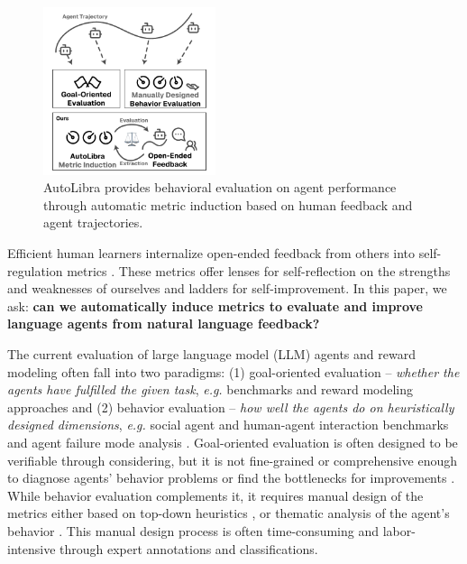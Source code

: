 \begin{figure}
   \vspace{-40pt}
   \centering
   \includegraphics[width=0.45\textwidth]{figs/autolibra.pdf}
   \caption{AutoLibra provides behavioral evaluation on agent performance
    through automatic metric induction based on human feedback and agent trajectories.}
\end{figure}


Efficient human learners internalize open-ended feedback from others into self-regulation metrics
\citep{pintrich2002development,nicol2006formative}.
These metrics offer lenses for self-reflection on the
strengths and weaknesses of ourselves and ladders for self-improvement.
In this paper, we ask:
\textbf{can we automatically induce metrics to evaluate and improve language agents from natural language feedback?} 

   
The current evaluation of large language model (LLM) agents and reward modeling often fall
into two paradigms: (1) goal-oriented evaluation --
\emph{whether the agents have fulfilled the given task},
\emph{e.g.} benchmarks \citep{zhouwebarena,jimenezswe,chan2024mle,paglieri2024balrog} and reward
modeling approaches \citep{pan2024autonomous,chen2025scaling,choudhury2025process}
and (2) behavior evaluation -- \emph{how well the agents do on heuristically designed dimensions},
\emph{e.g.} social agent and human-agent interaction benchmarks \citep{zhousotopia,shao2024collaborative}
and agent failure mode analysis \citep{pan2025why,zhang2023effects,yang2023behavioral}. 
Goal-oriented evaluation is often designed to be verifiable through considering, but it is not fine-grained
or comprehensive enough to diagnose agents' behavior problems or find the bottlenecks for improvements \citep{yehudai2025survey}.  
While behavior evaluation complements it, it requires manual design of the metrics either based on top-down heuristics
\citep{zhousotopia}, or thematic analysis of the agent's behavior \citep{shao2024collaborative,pan2025why}.
This manual design process is often time-consuming and labor-intensive through expert annotations and classifications. 

